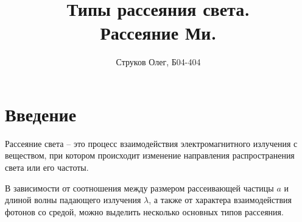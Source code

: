\documentclass[12pt, a4paper]{article}
\author{Струков Олег, Б04-404}
\date{}
\title{\textbf{Типы рассеяния света. \\Рассеяние Ми.}}
\begin{document}
\maketitle

\section*{Введение}


Рассеяние света -- это процесс взаимодействия электромагнитного излучения с веществом, при котором происходит изменение направления распространения света или его частоты.%


В зависимости от соотношения между размером рассеивающей частицы $a$ и длиной волны падающего излучения $\lambda$, а также от характера взаимодействия фотонов со средой, можно выделить несколько основных типов рассеяния. %


\end{document}
